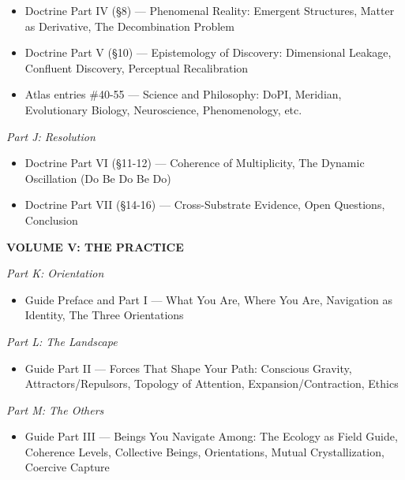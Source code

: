 \begin{itemize}[nosep,leftmargin=*]
  \item Doctrine Part IV (§8) — Phenomenal Reality: Emergent Structures, Matter as Derivative, The Decombination Problem
  \item Doctrine Part V (§10) — Epistemology of Discovery: Dimensional Leakage, Confluent Discovery, Perceptual Recalibration
  \item Atlas entries \#40-55 — Science and Philosophy: DoPI, Meridian, Evolutionary Biology, Neuroscience, Phenomenology, etc.
\end{itemize}


\textit{Part J: Resolution}

\begin{itemize}[nosep,leftmargin=*]
  \item Doctrine Part VI (§11-12) — Coherence of Multiplicity, The Dynamic Oscillation (Do Be Do Be Do)
  \item Doctrine Part VII (§14-16) — Cross-Substrate Evidence, Open Questions, Conclusion
\end{itemize}


\bigskip\noindent\makebox[\textwidth]{\color{rulegray}\rule{5cm}{0.3pt}}\bigskip


\textbf{VOLUME V: THE PRACTICE}


\textit{Part K: Orientation}

\begin{itemize}[nosep,leftmargin=*]
  \item Guide Preface and Part I — What You Are, Where You Are, Navigation as Identity, The Three Orientations
\end{itemize}


\textit{Part L: The Landscape}

\begin{itemize}[nosep,leftmargin=*]
  \item Guide Part II — Forces That Shape Your Path: Conscious Gravity, Attractors/Repulsors, Topology of Attention, Expansion/Contraction, Ethics
\end{itemize}


\textit{Part M: The Others}

\begin{itemize}[nosep,leftmargin=*]
  \item Guide Part III — Beings You Navigate Among: The Ecology as Field Guide, Coherence Levels, Collective Beings, Orientations, Mutual Crystallization, Coercive Capture
\end{itemize}


